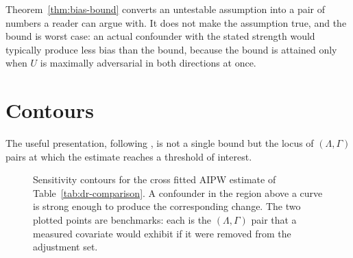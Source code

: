 Theorem~\ref{thm:bias-bound} converts an untestable assumption into a pair of
numbers a reader can argue with. It does not make the assumption true, and the
bound is worst case: an actual confounder with the stated strength would
typically produce less bias than the bound, because the bound is attained only
when $U$ is maximally adversarial in both directions at once.

\section{Contours}
\label{sec:sens-contours}

The useful presentation, following \citet{halloran2009sensitivity}, is not a
single bound but the locus of
$(\Lambda, \Gamma)$ pairs at which the estimate reaches a threshold of interest.

\begin{figure}[t]
\centering
{}
\caption[Sensitivity contours for the retraining estimate]{Sensitivity contours
for the cross fitted AIPW estimate of Table~\ref{tab:dr-comparison}. A
confounder in the region above a curve is strong enough to produce the
corresponding change. The two plotted points are benchmarks: each is the
$(\Lambda, \Gamma)$ pair that a measured covariate would exhibit if it were
removed from the adjustment set.}
\label{fig:sensitivity-contours}
\end{figure}

